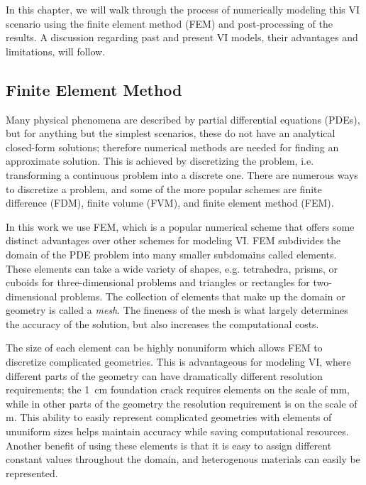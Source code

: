 In this chapter, we will walk through the process of numerically modeling this VI scenario using the finite element method (FEM) and post-processing of the results.
A discussion regarding past and present VI models, their advantages and limitations, will follow.\par

\subsection{Finite Element Method}


Many physical phenomena are described by partial differential equations (PDEs), but for anything but the simplest scenarios, these do not have an analytical closed-form solutions; therefore numerical methods are needed for finding an approximate solution.
This is achieved by discretizing the problem, i.e. transforming a continuous problem into a discrete one.
There are numerous ways to discretize a problem, and some of the more popular schemes are finite difference (FDM), finite volume (FVM), and finite element method (FEM).\par

In this work we use FEM, which is a popular numerical scheme that offers some distinct advantages over other schemes for modeling VI.
FEM subdivides the domain of the PDE problem into many smaller subdomains called elements.
These elements can take a wide variety of shapes, e.g. tetrahedra, prisms, or cuboids for three-dimensional problems and triangles or rectangles for two-dimensional problems.
The collection of elements that make up the domain or geometry is called a \textit{mesh}.
The fineness of the mesh is what largely determines the accuracy of the solution, but also increases the computational costs.\par

The size of each element can be highly nonuniform which allows FEM to discretize complicated geometries.
This is advantageous for modeling VI, where different parts of the geometry can have dramatically different resolution requirements; the \SI{1}{\centi\metre} foundation crack requires elements on the scale of \si{\milli\metre}, while in other parts of the geometry the resolution requirement is on the scale of \si{\metre}.
This ability to easily represent complicated geometries with elements of ununiform sizes helps maintain accuracy while saving computational resources.
Another benefit of using these elements is that it is easy to assign different constant values throughout the domain, and heterogenous materials can easily be represented.\par

